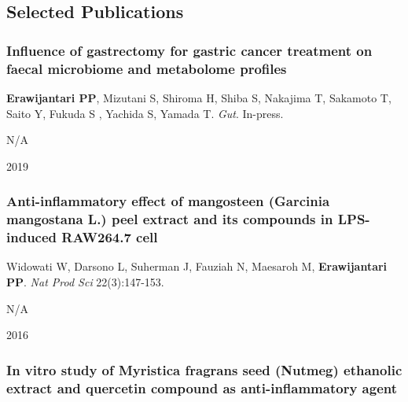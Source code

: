 \documentclass[]{article}
\begin{document}
\hypertarget{selected-publications}{%
\subsection{Selected Publications}\label{selected-publications}}

\hypertarget{influence-of-gastrectomy-for-gastric-cancer-treatment-on-faecal-microbiome-and-metabolome-profiles}{%
\subsubsection{\texorpdfstring{\textbf{Influence of gastrectomy for
gastric cancer treatment on faecal microbiome and metabolome
profiles}}{Influence of gastrectomy for gastric cancer treatment on faecal microbiome and metabolome profiles}}\label{influence-of-gastrectomy-for-gastric-cancer-treatment-on-faecal-microbiome-and-metabolome-profiles}}

\textbf{Erawijantari PP}, Mizutani S, Shiroma H, Shiba S, Nakajima T,
Sakamoto T, Saito Y, Fukuda S , Yachida S, Yamada T. \emph{Gut}.
In-press.

N/A

2019

\hypertarget{anti-inflammatory-effect-of-mangosteen-garcinia-mangostana-l.-peel-extract-and-its-compounds-in-lps-induced-raw264.7-cell}{%
\subsubsection{\texorpdfstring{\textbf{Anti-inflammatory effect of
mangosteen (Garcinia mangostana L.) peel extract and its compounds in
LPS-induced RAW264.7
cell}}{Anti-inflammatory effect of mangosteen (Garcinia mangostana L.) peel extract and its compounds in LPS-induced RAW264.7 cell}}\label{anti-inflammatory-effect-of-mangosteen-garcinia-mangostana-l.-peel-extract-and-its-compounds-in-lps-induced-raw264.7-cell}}

Widowati W, Darsono L, Suherman J, Fauziah N, Maesaroh M,
\textbf{Erawijantari PP}. \emph{Nat Prod Sci} 22(3):147-153.

N/A

2016

\hypertarget{in-vitro-study-of-myristica-fragrans-seed-nutmeg-ethanolic-extract-and-quercetin-compound-as-anti-inflammatory-agent}{%
\subsubsection{\texorpdfstring{\textbf{In vitro study of Myristica
fragrans seed (Nutmeg) ethanolic extract and quercetin compound as
anti-inflammatory
agent}}{In vitro study of Myristica fragrans seed (Nutmeg) ethanolic extract and quercetin compound as anti-inflammatory agent}}\label{in-vitro-study-of-myristica-fragrans-seed-nutmeg-ethanolic-extract-and-quercetin-compound-as-anti-inflammatory-agent}}
\end{document}
